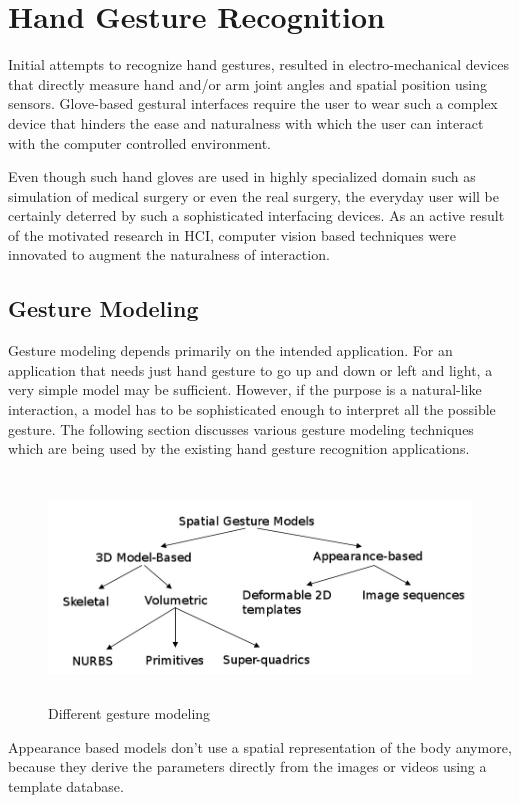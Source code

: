 \section{Hand Gesture Recognition} Initial attempts to recognize hand gestures, resulted in electro-mechanical devices that directly measure hand and/or arm joint angles and spatial position using sensors. Glove-based gestural interfaces require the user to wear such a complex device that hinders the ease and naturalness with which the user can interact with the computer controlled environment. 

Even though such hand gloves are used in highly specialized domain such as simulation of medical surgery or even the real surgery, the everyday user will be certainly deterred by such a sophisticated interfacing devices. As an active result of the motivated research in HCI, computer vision based techniques were innovated to augment the naturalness of interaction.

\subsection{Gesture Modeling} Gesture modeling depends primarily on the intended application. For an application that needs just hand gesture to go up and down or left and light, a very simple model may be sufficient. However, if the purpose is a natural-like interaction, a model has to be sophisticated enough to interpret all the possible gesture. The following section discusses various gesture modeling techniques which are being used by the existing hand gesture recognition applications. 

\begin{figure}
	[h] \centering 
	\includegraphics[height=6cm]{figures/ges-model.png} 
	\caption{Different gesture modeling} 
	\label{fig:ges:model} 
\end{figure}

Appearance based models don't use a spatial representation of the body anymore, because they derive the parameters directly from the images or videos using a template database. 

